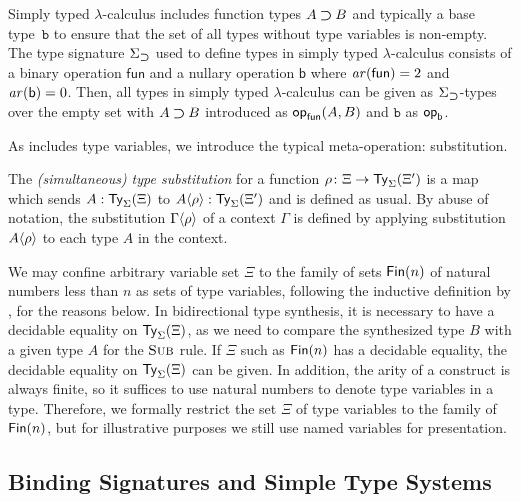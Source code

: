 \begin{example} \label{ex:type-signature-for-function-type}
  Simply typed $\lambda$-calculus includes function types $A \mathbin{\bm{\supset}} B$ and typically a base type~$\mathtt{b}$ to ensure that the set of all types without type variables is non-empty.
  The type signature $\Sigma_{\mathbin{\bm{\supset}}}$ used to define types in simply typed $\lambda$-calculus consists of a binary operation $\mathsf{fun}$ and a nullary operation $\mathsf{b}$ where $\mathit{ar}(\mathsf{fun}) = 2$ and $\mathit{ar}(\mathsf{b}) = 0$.
  Then, all types in simply typed $\lambda$-calculus can be given as $\Sigma_{\mathbin{\bm{\supset}}}$-types over the empty set with $A \mathbin{\bm{\supset}} B$ introduced as $\mathsf{op}_{\mathsf{fun}}(A, B)$ and $\mathtt{b}$ as $\mathsf{op}_{\mathsf{b}}$. 
\end{example}

As  includes type variables, we introduce the typical meta-operation: substitution.
\begin{definition}
  The \emph{(simultaneous) type substitution} for a function $\rho\colon\Xi \to \mathsf{Ty}_{\Sigma}(\Xi')$ is a map which sends $A : \mathsf{Ty}_{\Sigma}(\Xi)$ to ${A}\!\left<{\rho}\right> : \mathsf{Ty}_{\Sigma}(\Xi')$ and is defined as usual.
  By abuse of notation, the substitution ${\Gamma}\!\left<{\rho}\right>$ of a context $\Gamma$ is defined by applying substitution ${A}\!\left<{\rho}\right>$ to each type $A$ in the context.
\end{definition}

We may confine arbitrary variable set $\Xi$ to the family of sets $\mathsf{Fin}(n)$ of natural numbers less than $n$ as sets of type variables, following the inductive definition by \citet{Dybjer1994}, for the reasons below.
In bidirectional type synthesis, it is necessary to have a decidable equality on $\mathsf{Ty}_{\Sigma}(\Xi)$, as we need to compare the synthesized type $B$ with a given type $A$ for the $\textnormal{\textsc{Sub}}$ rule.
If $\Xi$ such as $\mathsf{Fin}(n)$ has a decidable equality, the decidable equality on $\mathsf{Ty}_{\Sigma}(\Xi)$ can be given.
In addition, the arity of a construct is always finite, so it suffices to use natural numbers to denote type variables in a type.
Therefore, we formally restrict the set $\Xi$ of type variables to the family of $\mathsf{Fin}(n)$, but for illustrative purposes we still use named variables for presentation.
\subsection{Binding Signatures and Simple Type Systems} \label{subsec:binding-sig}

